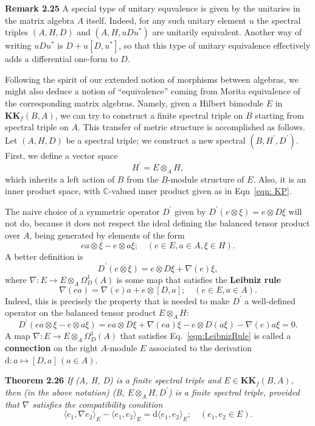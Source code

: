 \textbf{Remark 2.25} A special type of unitary equvalence is given by the unitaries in the matrix algebra $A$ itself. Indeed, for any such unitary element $u$ the spectral triples $(A, H, D)$ and $(A, H, uDu^*)$ are unitarily equivalent. Another way of writing $uDu^*$ is $D+u[D, u^*]$, so that this type of unitary equivalence effectively adds a differential one-form to $D$.

Following the spirit of our extended notion of morphisms between algebras, we might also deduce a notion of ``equivalence'' coming from Morita equivalence of the corresponding matrix algebras. Namely, given a Hilbert bimodule $E$ in $\mathbf{KK}_f(B, A)$, we can try to construct a finite spectral triple on $B$ starting from spectral triple on $A$. This transfer of metric structure is accomplished as follows. Let $(A, H, D)$ be a spectral triple; we construct a new spectral $(B, H^{\prime}, D^{\prime})$. First, we define a vector space
\[
H^{\prime} = E\otimes_AH,
\] 
which inherits a left action of $B$ from the $B$-module structure of $E$. Also, it is an inner product space, with $\mathbb{C}$-valued inner product given as in Eqn~\ref{eqn: KP}.

The naive choice of a symmetric operator $D^{\prime}$ given by $D^{\prime}(e\otimes\xi)=e\otimes D\xi$ will not do, because it does not respect the ideal defining the balanced tensor product over $A$, being generated by elements of the form 
\[
ea\otimes\xi-e\otimes a\xi;\quad (e\in E, a\in A, \xi\in H).
\]
A better definition is 
\begin{equation}
    D^{\prime}(e\otimes\xi)=e\otimes D\xi+\nabla(e)\xi,
    \label{eqn:D^prime}
\end{equation}
where $\nabla:E\rightarrow E\otimes_A\Omega_D^1(A)$ is some map that satisfies the \textbf{Leibniz rule}
\begin{equation}
    \nabla(ea)=\nabla(e)a+e\otimes[D,a]; \quad (e\in E, a\in A).
    \label{eqn:LeibnizRule}
\end{equation}
Indeed, this is precisely the property that is needed to make $D^{\prime}$ a well-defined operator on the balanced tensor product $E\otimes_A H$:
\[
D^{\prime}(ea\otimes\xi-e\otimes a\xi)=ea\otimes D\xi+\nabla(ea)\xi-e\otimes D(a\xi)-\nabla(e)a\xi=0.
\]
A map $\nabla: E\rightarrow E\otimes_A\Omega_D^1(A)$ that satisfies Eq.~\ref{eqn:LeibnizRule} is called a \textbf{connection} on the right $A$-module $E$ associated to the derivation $\text{d}:a\mapsto[D,a]\,(a\in A)$.

\textbf{Theorem 2.26} \textit{If (A, H, D) is a finite spectral triple and $E\in\mathbf{KK}_f(B, A)$, then (in the above notation) (B, $E\otimes_A H, D^{\prime}$) is a finite spectral triple, provided that $\nabla$ satisfies the compatibility condition}
\begin{equation}
    \langle e_1, \nabla e_2\rangle_E-\langle e_1, e_2\rangle_E=\text{d}\langle e_1, e_2\rangle_E;\quad (e_1, e_2\in E).
    \label{eqn:compatibilityCondtion}
\end{equation}

